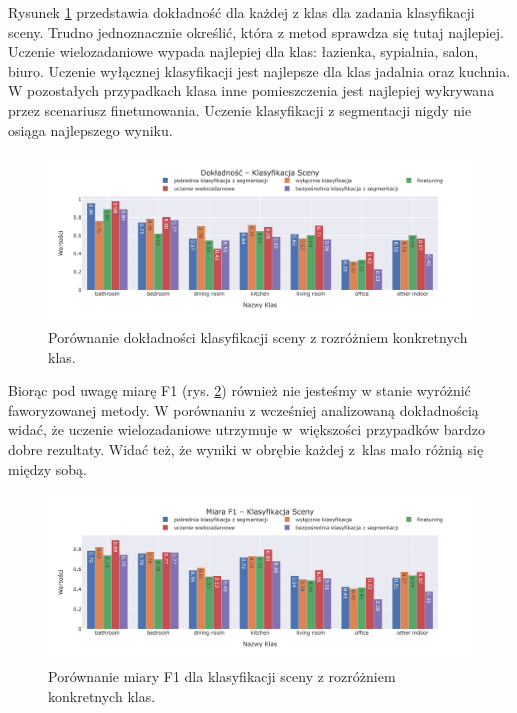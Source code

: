 \vspace{0.5cm}
Rysunek \ref{fig:classification-accuracy} przedstawia dokładność dla każdej z klas dla zadania klasyfikacji sceny. Trudno jednoznacznie określić, która z metod sprawdza się tutaj najlepiej. Uczenie wielozadaniowe wypada najlepiej dla klas: łazienka, sypialnia, salon, biuro. Uczenie wyłącznej klasyfikacji jest najlepsze dla klas jadalnia oraz kuchnia. W pozostałych przypadkach klasa inne pomieszczenia jest najlepiej wykrywana przez scenariusz finetunowania. Uczenie klasyfikacji z segmentacji nigdy nie osiąga najlepszego wyniku.
\begin{figure}[ht!]
    \centering
    \includegraphics[width=\textwidth]{img/pl-res/Dokladnosc-Klasyfikacja-Sceny.jpeg}
    \caption{Porównanie dokładności klasyfikacji sceny z rozróżniem konkretnych klas.}
    \label{fig:classification-accuracy}
\end{figure}
Biorąc pod uwagę miarę F1 (rys. \ref{fig:classification-f1}) również nie jesteśmy w stanie wyróżnić faworyzowanej metody. W porównaniu z wcześniej analizowaną dokładnością widać, że uczenie wielozadaniowe utrzymuje w~większości przypadków bardzo dobre rezultaty. Widać też, że wyniki w obrębie każdej z~klas mało różnią się między sobą.
\begin{figure}[ht!]
    \centering
    \includegraphics[width=\textwidth]{img/pl-res/Miara-F1-Klasyfikacja-Sceny.jpeg}
    \caption{Porównanie miary F1 dla klasyfikacji sceny z rozróżniem konkretnych klas.}
    \label{fig:classification-f1}
\end{figure}

